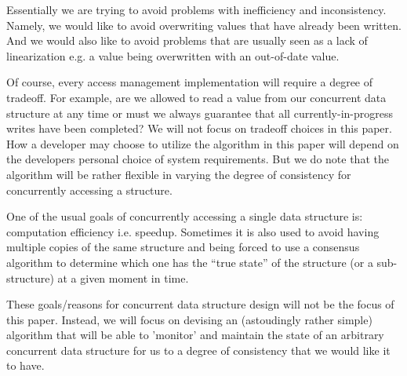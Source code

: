 Essentially we are trying to avoid problems with inefficiency and inconsistency. Namely, we would like to avoid overwriting values that have already been written. And we would also like to avoid problems that are usually seen as a lack of linearization e.g. a value being overwritten with an out-of-date value.

Of course, every access management implementation will require a degree of tradeoff. For example, are we allowed to read a value from our concurrent data structure at any time or must we always guarantee that all currently-in-progress writes have been completed? We will not focus on tradeoff choices in this paper. How a developer may choose to utilize the algorithm in this paper will depend on the developers personal choice of system requirements. But we do note that the algorithm will be rather flexible in varying the degree of consistency for concurrently accessing a structure.

One of the usual goals of concurrently accessing a single data structure is: computation efficiency i.e. speedup. Sometimes it is also used to avoid having multiple copies of the same structure and being forced to use a consensus algorithm to determine which one has the ``true state'' of the structure (or a sub-structure) at a given moment in time.

These goals/reasons for concurrent data structure design will not be the focus of this paper. Instead, we will focus on devising an (astoudingly rather simple) algorithm that will be able to 'monitor' and maintain the state of an arbitrary concurrent data structure for us to a degree of consistency that we would like it to have.




